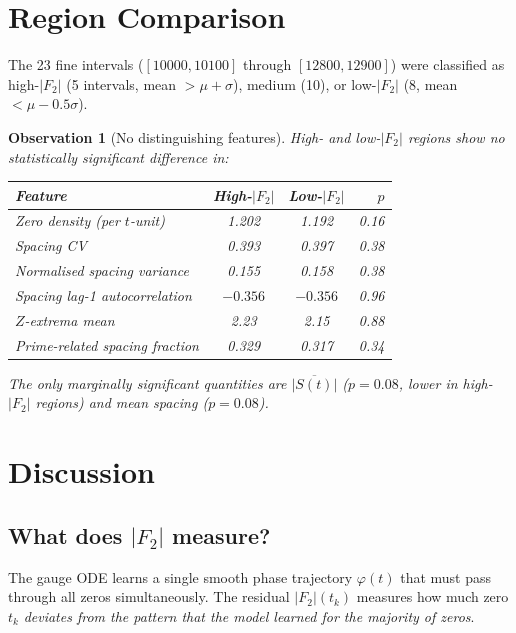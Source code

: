 \documentclass[11pt,a4paper]{article}
\newtheorem{observation}[theorem]{Observation}
\newcommand{\Ftwo}{|F_2|}
\begin{document}
\section{Region Comparison}

The 23 fine intervals ($[10000, 10100]$ through $[12800, 12900]$) were classified as
high-$\Ftwo$ (5 intervals, mean $> \mu + \sigma$),
medium (10), or low-$\Ftwo$ (8, mean $< \mu - 0.5\sigma$).

\begin{observation}[No distinguishing features]\label{obs:nodiff}
High- and low-$\Ftwo$ regions show no statistically significant difference in:
\begin{center}
\begin{tabular}{lccr}
\toprule
\textbf{Feature} & \textbf{High-$\Ftwo$} & \textbf{Low-$\Ftwo$} & $p$ \\
\midrule
Zero density (per $t$-unit) & 1.202 & 1.192 & 0.16 \\
Spacing CV & 0.393 & 0.397 & 0.38 \\
Normalised spacing variance & 0.155 & 0.158 & 0.38 \\
Spacing lag-1 autocorrelation & $-0.356$ & $-0.356$ & 0.96 \\
$Z$-extrema mean & 2.23 & 2.15 & 0.88 \\
Prime-related spacing fraction & 0.329 & 0.317 & 0.34 \\
\bottomrule
\end{tabular}
\end{center}
The only marginally significant quantities are
$\overline{|S(t)|}$ ($p = 0.08$, \emph{lower} in high-$\Ftwo$ regions)
and mean spacing ($p = 0.08$).
\end{observation}

\section{Discussion}

\subsection{What does $\Ftwo$ measure?}

The gauge ODE learns a single smooth phase trajectory $\varphi(t)$
that must pass through all zeros simultaneously.
The residual $\Ftwo(t_k)$ measures how much zero $t_k$ \emph{deviates from
the pattern that the model learned for the majority of zeros}.
\end{document}
